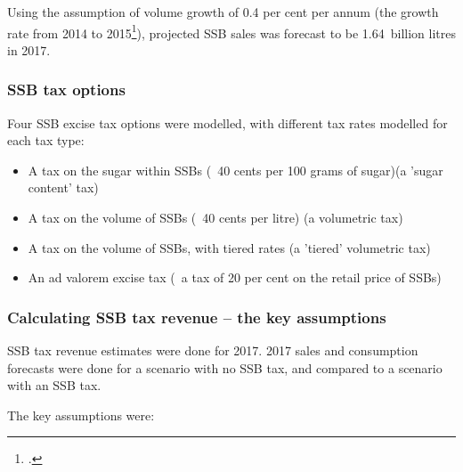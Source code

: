 \documentclass[embargoed]{grattan}
\begin{document}
Using the assumption of volume growth of 0.4 per cent per annum (the growth rate from 2014 to 2015\footcite{Media2015RetailWorldAnnual}), projected SSB sales was forecast to be 1.64~billion litres in 2017.

\subsubsection{SSB tax options}\label{ssb-tax-options}

Four SSB excise tax options were modelled, with different tax rates modelled for each tax type:

\begin{itemize}
\item
  A tax on the sugar within SSBs (\eg~40 cents per 100 grams of sugar)(a 'sugar content' tax)
\item
  A tax on the volume of SSBs (\eg~40 cents per litre) (a volumetric tax)
\item
  A tax on the volume of SSBs, with tiered rates (a 'tiered' volumetric tax)
\item
  An ad valorem excise tax (\eg~a tax of 20 per cent on the retail price of SSBs)
\end{itemize}

\subsubsection{Calculating SSB tax revenue -- the key assumptions }\label{calculating-ssb-tax-revenue-the-key-assumptions}

SSB tax revenue estimates were done for 2017. 2017 sales and consumption forecasts were done for a scenario with no SSB tax, and compared to a scenario with an SSB tax.

The key assumptions were:
\end{document}
